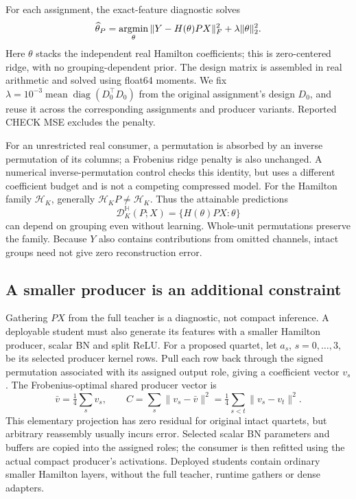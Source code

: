 \documentclass[conference,letterpaper,10pt]{IEEEtran}
\newcommand{\HH}{\mathbb{H}}
\begin{document}
For each assignment, the exact-feature diagnostic solves
\begin{equation}
 \widehat\theta_P=\mathop{\rm argmin}_{\theta}
 \|Y-H(\theta)PX\|_F^2+\lambda\|\theta\|_2^2.
 \label{eq:ridge}
\end{equation}
Here $\theta$ stacks the independent real Hamilton coefficients; this is zero-centered ridge, with no grouping-dependent prior. The design matrix is assembled in real arithmetic and solved using float64 moments. We fix $\lambda=10^{-3}\operatorname{mean}\operatorname{diag}(D_0^\top D_0)$ from the original assignment's design $D_0$, and reuse it across the corresponding assignments and producer variants. Reported CHECK MSE excludes the penalty.

For an unrestricted real consumer, a permutation is absorbed by an inverse permutation of its columns; a Frobenius ridge penalty is also unchanged. A numerical inverse-permutation control checks this identity, but uses a different coefficient budget and is not a competing compressed model. For the Hamilton family $\mathcal H_K$, generally $\mathcal H_KP\ne\mathcal H_K$. Thus the attainable predictions
\begin{equation}
 \mathcal D_K^{\HH}(P;X)=\{H(\theta)PX:\theta\}
\end{equation}
can depend on grouping even without learning. Whole-unit permutations preserve the family. Because $Y$ also contains contributions from omitted channels, intact groups need not give zero reconstruction error.

\subsection{A smaller producer is an additional constraint}
Gathering $PX$ from the full teacher is a diagnostic, not compact inference. A deployable student must also generate its features with a smaller Hamilton producer, scalar BN and split ReLU. For a proposed quartet, let $a_s$, $s=0,\ldots,3$, be its selected producer kernel rows. Pull each row back through the signed permutation associated with its assigned output role, giving a coefficient vector $v_s$. The Frobenius-optimal shared producer vector is
\begin{equation}
 \bar v=\tfrac14\sum_s v_s,\qquad
 C=\sum_s\|v_s-\bar v\|^2
   =\tfrac14\sum_{s<t}\|v_s-v_t\|^2.
 \label{eq:projection}
\end{equation}
This elementary projection has zero residual for original intact quartets, but arbitrary reassembly usually incurs error. Selected scalar BN parameters and buffers are copied into the assigned roles; the consumer is then refitted using the actual compact producer's activations. Deployed students contain ordinary smaller Hamilton layers, without the full teacher, runtime gathers or dense adapters.
\end{document}

